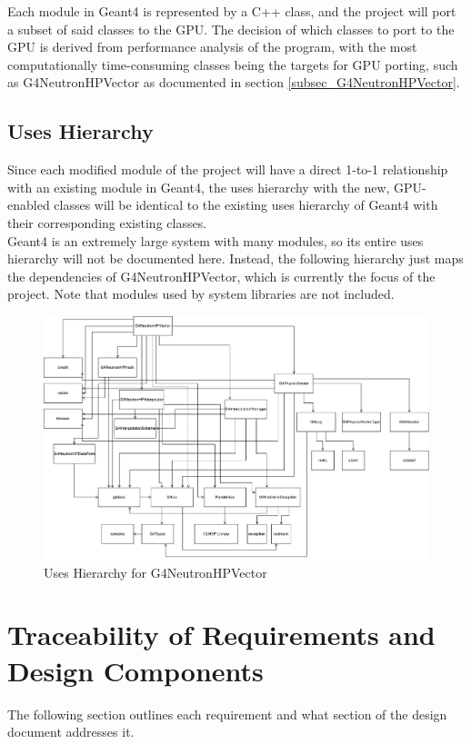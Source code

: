 \documentclass[12pt]{article}
\begin{document}
Each module in Geant4 is represented by a C++ class, and the project will port a subset of said classes to the GPU. The decision of which classes to port to the GPU is derived from performance analysis of the program, with the most computationally time-consuming classes being the targets for GPU porting, such as G4NeutronHPVector as documented in section \ref{subsec_G4NeutronHPVector}.

\subsection{Uses Hierarchy}
Since each modified module of the project will have a direct 1-to-1 relationship with an existing module in Geant4, the uses hierarchy with the new, GPU-enabled classes will be identical to the existing uses hierarchy of Geant4 with their corresponding existing classes.\\

Geant4 is an extremely large system with many modules, so its entire uses hierarchy will not be documented here. Instead, the following hierarchy just maps the dependencies of G4NeutronHPVector, which is currently the focus of the project. Note that modules used by system libraries are not included.
\begin{figure}
\caption{Uses Hierarchy for G4NeutronHPVector}\label{imgUsesHierarchy}
\includegraphics[width=\textwidth]{uses_hierarchy.pdf}
\end{figure}

\section{Traceability of Requirements and Design Components}%
The following section outlines each requirement and what section of the design document addresses it.
\end{document}
